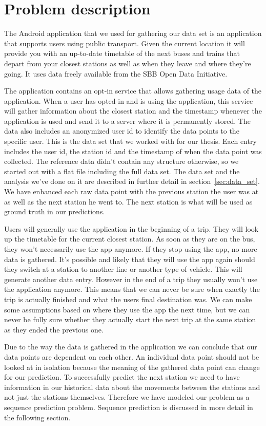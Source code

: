 \newpage
\chapter{Problem description}
The Android application that we used for gathering our data set is an application that supports users using public transport. Given the current location it will provide you with an up-to-date timetable of the next buses and trains that depart from your closest stations as well as when they leave and where they're going. It uses data freely available from the SBB Open Data Initiative. \cite{SBBOpenData} 

The application contains an opt-in service that allows gathering usage data of the application. When a user has opted-in and is using the application, this service will gather information about the closest station and the timestamp whenever the application is used and send it to a server where it is permanently stored. The data also includes an anonymized user id to identify the data points to the specific user. This is the data set that we worked with for our thesis. Each entry includes the user id, the station id and the timestamp of when the data point was collected. The reference data didn't contain any structure otherwise, so we started out with a flat file including the full data set. The data set and the analysis we've done on it are described in further detail in section~\ref{sec:data_set}. We have enhanced each raw data point with the previous station the user was at as well as the next station he went to. The next station is what will be used as ground truth in our predictions.

Users will generally use the application in the beginning of a trip. They will look up the timetable for the current closest station. As soon as they are on the bus, they won't necessarily use the app anymore. If they stop using the app, no more data is gathered. It's possible and likely that they will use the app again should they switch at a station to another line or another type of vehicle. This will generate another data entry. However in the end of a trip they usually won't use the application anymore. This means that we can never be sure when exactly the trip is actually finished and what the users final destination was. We can make some assumptions based on where they use the app the next time, but we can never be fully sure whether they actually start the next trip at the same station as they ended the previous one.

Due to the way the data is gathered in the application we can conclude that our data points are dependent on each other. An individual data point should not be looked at in isolation because the meaning of the gathered data point can change for our prediction. To successfully predict the next station we need to have information in our historical data about the movements between the stations and not just the stations themselves. Therefore we have modeled our problem as a sequence prediction problem. Sequence prediction is discussed in more detail in the following section. 

